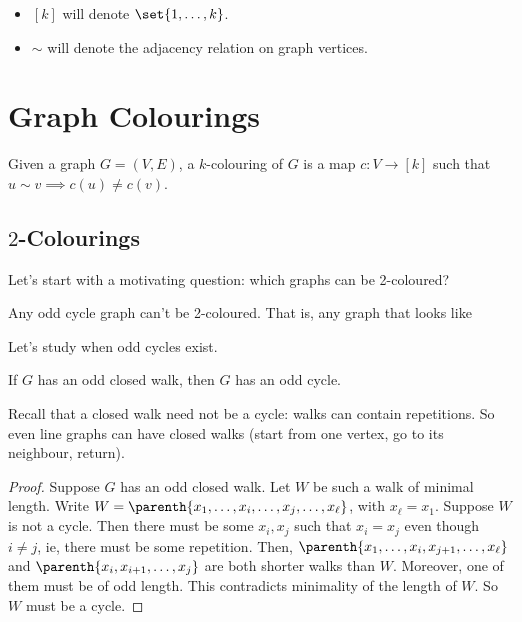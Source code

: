 \begin{boxnotation} \hfill
    \begin{itemize}
        \item $[k]$ will denote $\set{1, \ldots, k}$.
        \item $\sim$ will denote the adjacency relation on graph vertices.
    \end{itemize}
\end{boxnotation}

\section{Graph Colourings}

\begin{boxdefinition}[Colouring]
    Given a graph $G = (V, E)$, a $k$-colouring of $G$ is a map $c : V \to [k]$ such that $u \sim v \implies c(u) \ne c(v)$.
\end{boxdefinition}

\subsection{$2$-Colourings}

Let's start with a motivating question: which graphs can be 2-coloured?

Any odd cycle graph can't be 2-coloured. That is, any graph that looks like

Let's study when odd cycles exist.

\begin{boxlemma}
    If $G$ has an odd closed walk, then $G$ has an odd cycle.
\end{boxlemma}
Recall that a closed walk need not be a cycle: walks can contain repetitions. So even line graphs can have closed walks (start from one vertex, go to its neighbour, return).
\begin{proof}
    Suppose $G$ has an odd closed walk. Let $W$ be such a walk of minimal length. Write $W = \parenth{x_1, \ldots, x_i, \ldots, x_j, \ldots, x_{\ell}}$, with $x_{\ell} = x_1$. Suppose $W$ is not a cycle. Then there must be some $x_i, x_j$ such that $x_i = x_j$ even though $i \neq j$, ie, there must be some repetition. Then, $\parenth{x_1, \ldots, x_i, x_{j+1}, \ldots, x_{\ell}}$ and $\parenth{x_i, x_{i+1}, \ldots, x_{j}}$ are both shorter walks than $W$. Moreover, one of them must be of odd length. This contradicts minimality of the length of $W$. So $W$ must be a cycle.
\end{proof}

